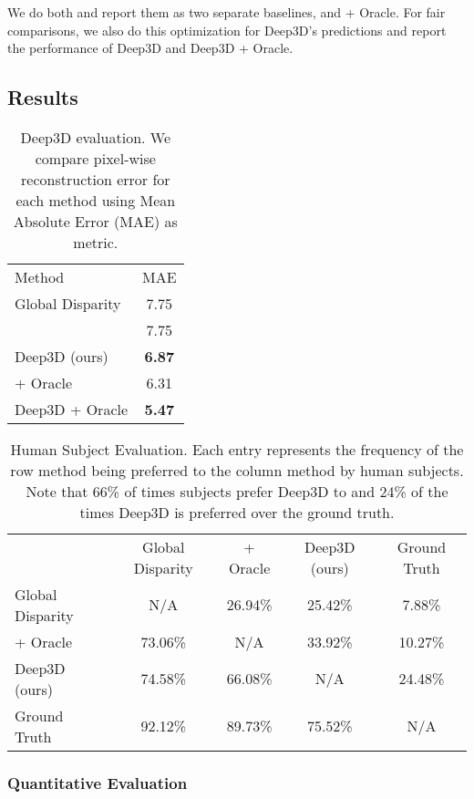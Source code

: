 \documentclass[runningheads]{llncs}
\begin{document}
We do both and report them as two separate baselines, \cite{eigen2014depth} and \cite{eigen2014depth} + Oracle.
For fair comparisons, we also do this optimization for Deep3D's predictions and report the performance of Deep3D and Deep3D + Oracle.

\subsection{Results}\begin{table}[!ht]
\begin{center}
\caption{Deep3D evaluation. We compare pixel-wise reconstruction error for each method using Mean Absolute Error (MAE) as metric.}
\label{table:objeval}
\begin{tabular}{lc}
\hline\noalign{\smallskip}
Method & MAE\\
\noalign{\smallskip}
\hline
\noalign{\smallskip}
Global Disparity                             & 7.75\\
\cite{eigen2014depth}                        & 7.75\\
Deep3D (ours)                                & \textbf{6.87}\\
\hline
\cite{eigen2014depth} + Oracle \hspace{0.8in}               & 6.31\\
Deep3D + Oracle                              & \textbf{5.47}\\
\hline
\end{tabular}
\end{center}
\end{table}\begin{table}[t]
\begin{center}
\caption{Human Subject Evaluation. Each entry represents the frequency of the row method being preferred to the column method by human subjects.
Note that 66\% of times subjects prefer Deep3D to \cite{eigen2014depth} and 24\% of the times Deep3D is preferred over the ground truth.}
\label{table:subjeval}
\begin{tabular}{l|c|c|c|c}
\hline\noalign{\smallskip}
  & Global Disparity & \cite{eigen2014depth} + Oracle & Deep3D (ours) & Ground Truth\\
\noalign{\smallskip}
\hline
\noalign{\smallskip}
Global Disparity                    &   N/A &   26.94\% &   25.42\% &   7.88\%  \\
\cite{eigen2014depth} + Oracle      &   73.06\% &   N/A &   33.92\% &   10.27\% \\
Deep3D (ours)                       &   74.58\% &   66.08\% &   N/A &   24.48\% \\
Ground Truth                        &   92.12\% &   89.73\% &   75.52\% &   N/A \\
\hline
\end{tabular}
\end{center}
\end{table}\subsubsection{Quantitative Evaluation}%
\end{document}
